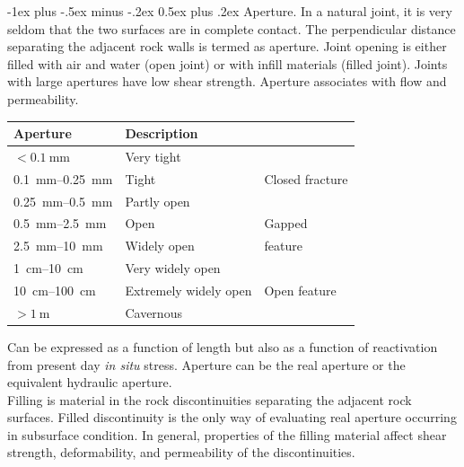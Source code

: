 \documentclass[10pt,landscape,a4paper]{article}
\makeatletter
\renewcommand{\section}{\@startsection{section}{1}{0mm}%
	{-1ex plus -.5ex minus -.2ex}%
	{0.5ex plus .2ex}%
	{\normalfont\large\bfseries}}
\makeatother
\begin{document}
\begin{multicols}{3}
	\section{Aperture.}
	In a natural joint, it is very seldom that the two surfaces are in complete contact.
	The perpendicular distance separating the adjacent rock walls is termed as aperture.
	Joint opening is either filled with air and water (open joint) or with infill materials (filled joint).
	Joints with large apertures have low shear strength.
	Aperture associates with flow and permeability.
	\begin{table}[H]\scriptsize\centering\begin{tabular}{lll}
			Aperture                          & Description           &                 \\
			\hline
			$<\SI{0.1}{\milli\meter}$         & Very tight            &                 \\
			\SIrange{0.1}{0.25}{\milli\meter} & Tight                 & Closed fracture \\
			\SIrange{0.25}{0.5}{\milli\meter} & Partly open           &                 \\
			\hline
			\SIrange{0.5}{2.5}{\milli\meter}  & Open                  & Gapped          \\
			\SIrange{2.5}{10}{\milli\meter}   & Widely open           & feature         \\
			\hline
			\SIrange{1}{10}{\centi\meter}     & Very widely open      &                 \\
			\SIrange{10}{100}{\centi\meter}   & Extremely widely open & Open feature    \\
			$>\SI{1}{\meter}$                 & Cavernous             & 
		\end{tabular}\end{table}
	Can be expressed as a function of length but also as a function of reactivation from present day \textit{in situ} stress.
	Aperture can be the real aperture or the equivalent hydraulic aperture.\\
	Filling is material in the rock discontinuities separating the adjacent rock surfaces.
	Filled discontinuity is the only way of evaluating real aperture occurring in subsurface condition.
	In general, properties of the filling material affect shear strength, deformability, and permeability of the discontinuities.
	

\end{multicols}
\end{document}

